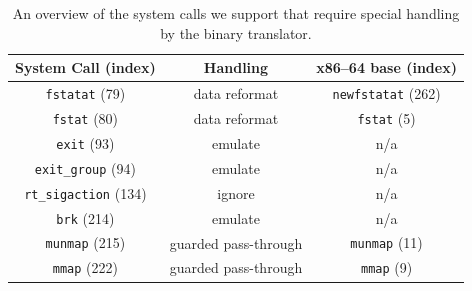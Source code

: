 \begin{table}
	\centering
	\begin{tabular}{ccc}
		\toprule
		\textbf{System Call (index)} & \textbf{Handling} & \textbf{x86--64 base (index)}\\
		\midrule
		\texttt{fstatat} (79) & data reformat & \texttt{newfstatat} (262)\\
		\texttt{fstat} (80) & data reformat & \texttt{fstat} (5)\\
		\texttt{exit} (93) & emulate & n/a\\
		\texttt{exit\_group} (94) & emulate & n/a\\
		\texttt{rt\_sigaction} (134) & ignore & n/a\\
		\texttt{brk} (214) & emulate & n/a\\
		\texttt{munmap} (215) & guarded pass-through & \texttt{munmap} (11)\\
		\texttt{mmap} (222) & guarded pass-through & \texttt{mmap} (9)\\
		\bottomrule
	\end{tabular}
	\caption[Specially handled system calls overview]%
	{An overview of the system calls we support that require special handling by the binary translator.}
	\label{tab:syscall-special}
\end{table}


